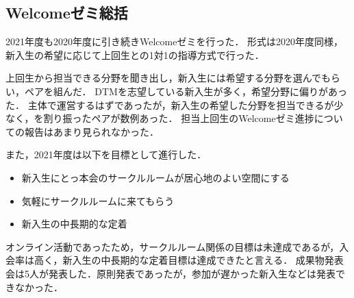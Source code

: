 \subsection*{Welcomeゼミ総括}


2021年度も2020年度に引き続きWelcomeゼミを行った．
形式は2020年度同様，新入生の希望に応じて上回生との1対1の指導方式で行った．

上回生から担当できる分野を聞き出し，新入生には希望する分野を選んでもらい，ペアを組んだ．
DTMを志望している新入生が多く，希望分野に偏りがあった．
\secondGrade{}主体で運営するはずであったが，新入生の希望した分野を担当できる\secondGrade{}が少なく，\thirdGrade{}を割り振ったペアが数例あった．
担当上回生のWelcomeゼミ進捗についての報告はあまり見られなかった．

また，2021年度は以下を目標として進行した．
\begin{itemize}
	\item 新入生にとっ本会のサークルルームが居心地のよい空間にする
	\item 気軽にサークルルームに来てもらう
	\item 新入生の中長期的な定着
\end{itemize}

オンライン活動であったため，サークルルーム関係の目標は未達成であるが，入会率は高く，新入生の中長期的な定着目標は達成できたと言える．
成果物発表会は5人が発表した．原則発表であったが，参加が遅かった新入生などは発表できなかった．
